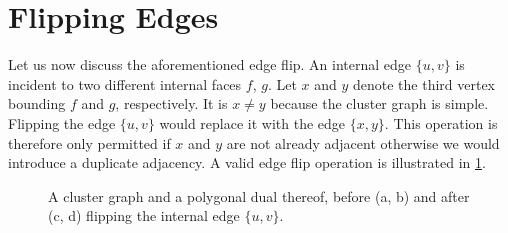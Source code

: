 \section{Flipping Edges}
\label{sect:flipping-edges}

Let us now discuss the aforementioned edge flip. An internal edge $\{u,v\}$ is incident to two different internal faces $f$, $g$. Let $x$ and $y$ denote the third vertex bounding $f$ and $g$, respectively. It is $x \neq y$ because the cluster graph is simple. Flipping the edge $\{u,v\}$ would replace it with the edge $\{x,y\}$. This operation is therefore only permitted if $x$ and $y$ are not already adjacent \emdash{} otherwise we would introduce a duplicate adjacency. A valid edge flip operation is illustrated in \cref{fig:flip-internal-edge-example}.


\begin{figure}[H]
	\centering
	\quad
	\qquad
	\quad
	\caption{A cluster graph and a polygonal dual thereof, before (a, b) and after (c, d) flipping the internal edge $\{u,v\}$.}
	\label{fig:flip-internal-edge-example}
\end{figure}

